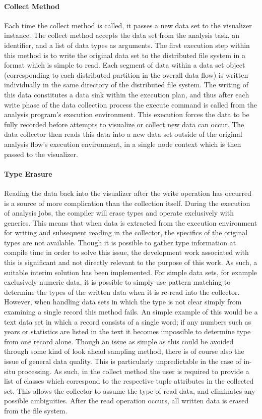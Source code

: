 \paragraph{Collect Method}
Each time the collect method is called, it passes a new data set to the visualizer instance. The collect method accepts the data set from the analysis task, an identifier, and a list of data types as arguments. The first execution step within this method is to write the original data set to the distributed file system in a format which is simple to read. Each segment of data within a data set object (corresponding to each distributed partition in the overall data flow) is written individually in the same directory of the distributed file system. The writing of this data constitutes a data sink within the execution plan, and thus after each write phase of the data collection process the execute command is called from the analysis program's execution environment. This execution forces the data to be fully recorded before attempts to visualize or collect new data can occur. The data collector then reads this data into a new data set outside of the original analysis flow's execution environment, in a single node context which is then passed to the visualizer.

\paragraph{Type Erasure}
Reading the data back into the visualizer after the write operation has occurred is a source of more complication than the collection itself. During the execution of analysis jobs, the compiler will erase types and operate exclusively with generics. This means that when data is extracted from the execution environment for writing and subsequent reading in the collector, the specifics of the original types are not available. Though it is possible to gather type information at compile time in order to solve this issue, the development work associated with this is significant and not directly relevant to the purpose of this work. As such, a suitable interim solution has been implemented. For simple data sets, for example exclusively numeric data, it is possible to simply use pattern matching to determine the types of the written data when it is re-read into the collector. However, when handling data sets in which the type is not clear simply from examining a single record this method fails. An simple example of this would be a text data set in which a record consists of a single word; if any numbers such as years or statistics are listed in the text it becomes impossible to determine type from one record alone. Though an issue as simple as this could be avoided through some kind of look ahead sampling method, there is of course also the issue of general data quality. This is particularly unpredictable in the case of in-situ processing. As such, in the collect method the user is required to provide a list of classes which correspond to the respective tuple attributes in the collected set. This allows the collector to assume the type of read data, and eliminates any possible ambiguities. After the read operation occurs, all written data is erased from the file system. 
  
